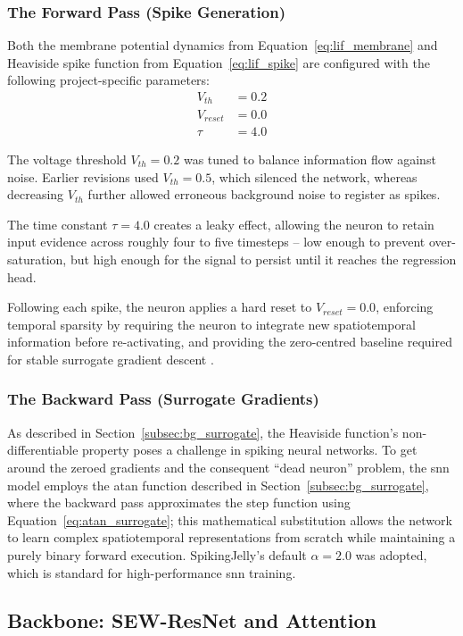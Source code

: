 \subsubsection{The Forward Pass (Spike Generation)}
Both the membrane potential dynamics from Equation~\ref{eq:lif_membrane} and Heaviside spike function from Equation~\ref{eq:lif_spike} are configured with the following project-specific parameters:
\begin{align*}
    V_{th} &= 0.2 \\
    V_{reset} &= 0.0 \\
    \tau &= 4.0
\end{align*}

The voltage threshold $V_{th} = 0.2$ was tuned to balance information flow against noise. Earlier revisions used $V_{th} = 0.5$, which silenced the network, whereas decreasing $V_{th}$ further allowed erroneous background noise to register as spikes.

The time constant $\tau = 4.0$ creates a leaky effect, allowing the neuron to retain input evidence across roughly four to five timesteps -- low enough to prevent over-saturation, but high enough for the signal to persist until it reaches the regression head.

Following each spike, the neuron applies a hard reset to $V_{reset} = 0.0$, enforcing temporal sparsity by requiring the neuron to integrate new spatiotemporal information before re-activating,
and providing the zero-centred baseline required for stable surrogate gradient descent \cite{fang2022resnet_sew}. 

\subsubsection{The Backward Pass (Surrogate Gradients)}
As described in Section~\ref{subsec:bg_surrogate}, the Heaviside function's non-differentiable property poses a challenge in spiking neural networks.
To get around the zeroed gradients and the consequent ``dead neuron'' problem, the \gls{snn} model employs the \gls{atan} function described in Section~\ref{subsec:bg_surrogate}, where the backward pass approximates the step function using Equation~\ref{eq:atan_surrogate};
this mathematical substitution allows the network to learn complex spatiotemporal representations from scratch while maintaining a purely binary forward execution.
SpikingJelly's default $\alpha = 2.0$ was adopted, which is standard for high-performance \gls{snn} training.

\subsection{Backbone: SEW-ResNet and Attention}
\label{subsec:snn_backbone}

